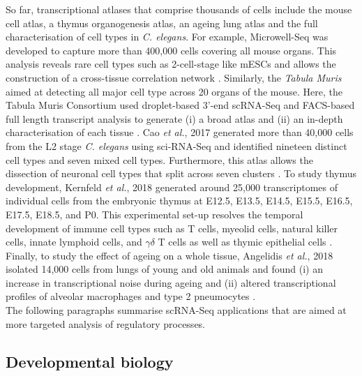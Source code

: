 So far, transcriptional atlases that comprise thousands of cells include the mouse cell atlas, a thymus organogenesis atlas, an ageing lung atlas and the full characterisation of cell types in \textit{C. elegans}. For example, Microwell-Seq was developed to capture more than 400,000 cells covering all mouse organs. This analysis reveals rare cell types such as 2-cell-stage like mESCs and allows the construction of a cross-tissue correlation network \cite{Han2018}. Similarly, the \emph{Tabula Muris} aimed at detecting all major cell type across 20 organs of the mouse. Here, the Tabula Muris Consortium used droplet-based 3'-end scRNA-Seq and FACS-based full length transcript analysis to generate (i) a broad atlas and (ii) an in-depth characterisation of each tissue \citep{Quake2018}. Cao \emph{et al.}, 2017 generated more than 40,000 cells from the L2 stage \emph{C. elegans} using sci-RNA-Seq and identified nineteen distinct cell types and seven mixed cell types. Furthermore, this atlas allows the dissection of neuronal cell types that split across seven clusters \citep{Cao2017}. To study thymus development, Kernfeld \emph{et al.}, 2018 generated around 25,000 transcriptomes of individual cells from the embryonic thymus at E12.5, E13.5, E14.5, E15.5, E16.5, E17.5, E18.5, and P0. This experimental set-up resolves the temporal development of immune cell types such as T cells, myeolid cells, natural killer cells, innate lymphoid cells, and $\gamma{}\delta{}$ T cells as well as thymic epithelial cells \citep{Kernfeld2018}. Finally, to study the effect of ageing on a whole tissue, Angelidis \emph{et al.}, 2018 isolated 14,000 cells from lungs of young and old animals and found (i) an increase in transcriptional noise during ageing and (ii) altered transcriptional profiles of alveolar macrophages and type 2 pneumocytes \citep{Angelidis2018}.\\

The following paragraphs summarise scRNA-Seq applications that are aimed at more targeted analysis of regulatory processes.

\subsection{Developmental biology}

